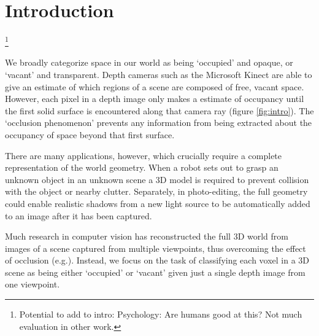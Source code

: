 \documentclass[10pt,twocolumn,letterpaper]{article}
\makeatletter
\renewcommand*{\eg}{e.g.\@\xspace}
\makeatother
\begin{document}
\section{Introduction}
\footnote{Potential to add to intro: Psychology: Are humans good at this? Not much evaluation in other work.}


We broadly categorize space in our world as being `occupied' and opaque, or `vacant' and transparent.
Depth cameras such as the Microsoft Kinect are able to give an estimate of which regions of a scene are composed of free, vacant space.
However, each pixel in a depth image only makes a estimate of occupancy until the first solid surface is encountered along that camera ray (figure \ref{fig:intro}).
The `occlusion phenomenon' prevents any information from being extracted about the occupancy of space beyond that first surface.

There are many applications, however, which crucially require a complete representation of the world geometry.
When a robot sets out to grasp an unknown object in an unknown scene a 3D model is required to prevent collision with the object or nearby clutter.
Separately, in photo-editing, the full geometry could enable realistic shadows from a new light source to be automatically added to an image after it has been captured.

Much research in computer vision has reconstructed the full 3D world from images of a scene captured from multiple viewpoints, thus overcoming the effect of occlusion  (\eg \cite{izadi-uist-2011}).
Instead, we focus on the task of classifying each voxel in a 3D scene as being either `occupied' or `vacant' given just a single depth image from one viewpoint.

\end{document}
